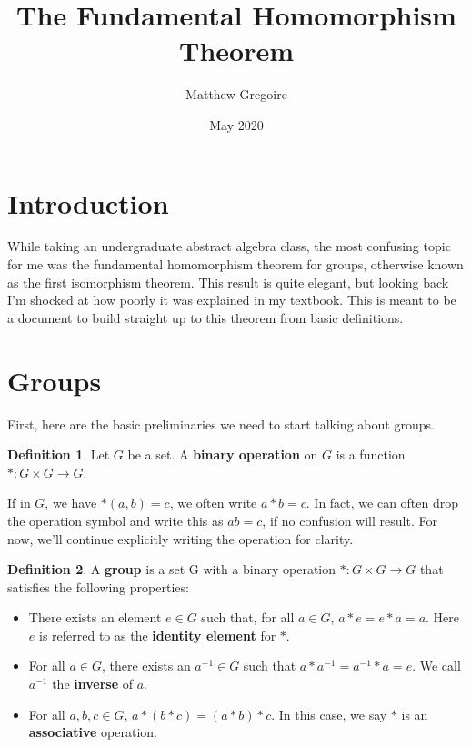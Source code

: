 \documentclass[12pt]{article}
\title{The Fundamental Homomorphism Theorem}
\author{Matthew Gregoire}
\date{May 2020}
\newcommand{\inv}[1]{#1^{-1}}
\theoremstyle{definition}
\newtheorem{definition}{Definition}[section]
\newenvironment{defn}[1][]
{\theoremstyle{definition}
\begin{definition}{}}
{\end{definition}}
\begin{document}
\maketitle

\tableofcontents

\pagebreak

\section{Introduction}

While taking an undergraduate abstract algebra class, the most confusing topic for me was the fundamental homomorphism theorem for groups, otherwise known as the first isomorphism theorem. This result is quite elegant, but looking back I'm shocked at how poorly it was explained in my textbook. This is meant to be a document to build straight up to this theorem from basic definitions.

\section{Groups}

First, here are the basic preliminaries we need to start talking about groups.

\begin{defn}
Let $G$ be a set. A \textbf{binary operation} on $G$ is a function $*: G \times G \to G$.
\end{defn}

If in $G$, we have $*(a, b) = c$, we often write $a * b = c$. In fact, we can often drop the operation symbol and write this as $ab = c$, if no confusion will result. For now, we'll continue explicitly writing the operation for clarity.


\begin{defn}
A \textbf{group} is a set G with a binary operation $*: G \times G \to G$ that satisfies the following properties:
\begin{itemize}
    \item There exists an element $e \in G$ such that, for all $a \in G$, $a*e = e*a = a$. Here $e$ is referred to as the \textbf{identity element} for $*$.
    \item For all $a \in G$, there exists an $\inv{a} \in G$ such that $a*\inv{a} = \inv{a}*a = e$. We call $\inv{a}$ the \textbf{inverse} of $a$.
    \item For all $a, b, c \in G$, $a * (b * c) = (a * b) * c$. In this case, we say $*$ is an \textbf{associative} operation.
\end{itemize}
\end{defn}
\end{document}
